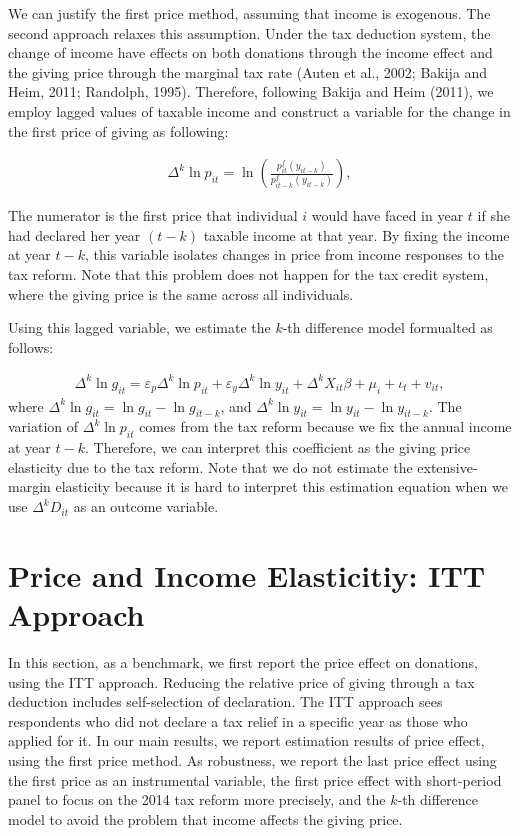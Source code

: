 \documentclass[
  11pt,
  a4paper,
]{article}
\begin{document}
We can justify the first price method, assuming that income is exogenous.
The second approach relaxes this assumption.
Under the tax deduction system,
the change of income have effects on both donations through the income effect
and the giving price through the marginal tax rate (Auten et al., 2002; Bakija and Heim, 2011; Randolph, 1995).
Therefore, following Bakija and Heim (2011),
we employ lagged values of taxable income and
construct a variable for the change in the first price of giving as following:

\begin{align}
  \Delta^k \ln p_{it} = \ln \left(\frac{p^f_{it}(y_{it-k})}{p^f_{it-k}(y_{it-k})}\right),
  \label{eq:laggedp}
\end{align}

The numerator is the first price that individual \(i\) would have faced in year \(t\)
if she had declared her year \((t - k)\) taxable income at that year.
By fixing the income at year \(t - k\), this variable isolates changes in price from income responses to the tax reform.
Note that this problem does not happen for the tax credit system, where the giving price is the same across all individuals.

Using this lagged variable, we estimate the \(k\)-th difference model formualted as follows:

\begin{align}
  \Delta^k \ln g_{it} = \varepsilon_p \Delta^k \ln p_{it} + \varepsilon_y \Delta^k \ln y_{it} 
  + \Delta^k X_{it} \beta + \mu_i + \iota_t + v_{it}, \label{eq:kdiff}
\end{align}
where \(\Delta^k \ln g_{it} = \ln g_{it} - \ln g_{it-k}\),
and \(\Delta^k \ln y_{it} = \ln y_{it} - \ln y_{it-k}\).
The variation of \(\Delta^k \ln p_{it}\) comes from the tax reform because we fix the annual income at year \(t - k\).
Therefore, we can interpret this coefficient as the giving price elasticity due to the tax reform.
Note that we do not estimate the extensive-margin elasticity because it is hard to interpret this estimation equation when we use \(\Delta^k D_{it}\) as an outcome variable.

\hypertarget{price-and-income-elasticitiy-itt-approach}{%
\section{Price and Income Elasticitiy: ITT Approach}\label{price-and-income-elasticitiy-itt-approach}}

In this section, as a benchmark, we first report the price effect on donations, using the ITT approach.
Reducing the relative price of giving through a tax deduction includes self-selection of declaration.
The ITT approach sees respondents who did not declare a tax relief in a specific year as those who applied for it.
In our main results, we report estimation results of price effect, using the first price method.
As robustness, we report the last price effect using the first price as an instrumental variable,
the first price effect with short-period panel to focus on the 2014 tax reform more precisely,
and the \(k\)-th difference model to avoid the problem that income affects the giving price.
\end{document}

